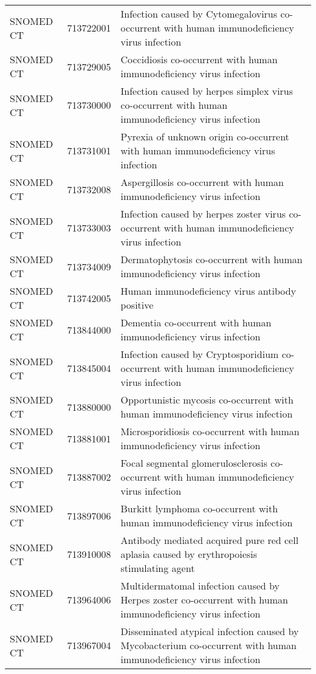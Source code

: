 \begin{table}[ht]
\begin{tabular}{lll}
  SNOMED CT & 713722001 & Infection caused by Cytomegalovirus co-occurrent with human immunodeficiency virus infection \\ 
  SNOMED CT & 713729005 & Coccidiosis co-occurrent with human immunodeficiency virus infection \\ 
  SNOMED CT & 713730000 & Infection caused by herpes simplex virus co-occurrent with human immunodeficiency virus infection \\ 
  SNOMED CT & 713731001 & Pyrexia of unknown origin co-occurrent with human immunodeficiency virus infection \\ 
  SNOMED CT & 713732008 & Aspergillosis co-occurrent with human immunodeficiency virus infection \\ 
  SNOMED CT & 713733003 & Infection caused by herpes zoster virus co-occurrent with human immunodeficiency virus infection \\ 
  SNOMED CT & 713734009 & Dermatophytosis co-occurrent with human immunodeficiency virus infection \\ 
  SNOMED CT & 713742005 & Human immunodeficiency virus antibody positive \\ 
  SNOMED CT & 713844000 & Dementia co-occurrent with human immunodeficiency virus infection \\ 
  SNOMED CT & 713845004 & Infection caused by Cryptosporidium co-occurrent with human immunodeficiency virus infection \\ 
  SNOMED CT & 713880000 & Opportunistic mycosis co-occurrent with human immunodeficiency virus infection \\ 
  SNOMED CT & 713881001 & Microsporidiosis co-occurrent with human immunodeficiency virus infection \\ 
  SNOMED CT & 713887002 & Focal segmental glomerulosclerosis co-occurrent with human immunodeficiency virus infection \\ 
  SNOMED CT & 713897006 & Burkitt lymphoma co-occurrent with human immunodeficiency virus infection \\ 
  SNOMED CT & 713910008 & Antibody mediated acquired pure red cell aplasia caused by erythropoiesis stimulating agent \\ 
  SNOMED CT & 713964006 & Multidermatomal infection caused by Herpes zoster co-occurrent with human immunodeficiency virus infection \\ 
  SNOMED CT & 713967004 & Disseminated atypical infection caused by Mycobacterium co-occurrent with human immunodeficiency virus infection \\ 

\end{tabular}
\end{table}
